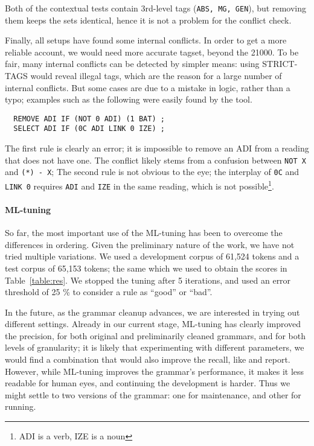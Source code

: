\documentclass[11pt]{article}
\begin{document}
\noindent Both of the contextual tests contain 3rd-level tags (\texttt{ABS, MG, GEN}), but removing them keeps the sets identical, hence it is not a problem for the conflict check.



Finally, all setups have found some internal conflicts. In order to get a more reliable account, we would need 
more accurate tagset, beyond the 21000. To be fair, many internal conflicts can be detected by simpler means:
using STRICT-TAGS would reveal illegal tags, which are the reason for a large number of internal conflicts. 
But some cases are due to a mistake in logic, rather than a typo; examples such as the following were easily found by the tool. %

\begin{verbatim}
  REMOVE ADI IF (NOT 0 ADI) (1 BAT) ;
  SELECT ADI IF (0C ADI LINK 0 IZE) ;
\end{verbatim}

\noindent The first rule is clearly an error; it is impossible to remove an ADI from a reading that does not have one.
The conflict likely stems from a confusion between \texttt{NOT X} and \texttt{(*) - X};
The second rule is not obvious to the eye; the interplay of \texttt{0C} and \texttt{LINK 0} requires 
\texttt{ADI} and \texttt{IZE} in the same reading, which is not possible\footnote{ADI is a verb, IZE is a noun}.


\paragraph{ML-tuning}

So far, the most important use of the ML-tuning has been to overcome
the differences in ordering. 
Given the preliminary nature of the work, we have not tried multiple
variations. We used a development corpus of 61,524
tokens and a test corpus of 65,153 tokens; the same which we used to
obtain the scores in Table~\ref{table:res}. We stopped the tuning
after 5 iterations, and used an error threshold of 25 \% to consider a
rule as ``good'' or ``bad''. 

In the future, as the grammar cleanup advances, we are interested in
trying out different settings.
Already in our current stage, ML-tuning has clearly
improved the precision, for both original and preliminarily cleaned
grammars, and for both levels of granularity; it is likely that
experimenting with different parameters, we would find a combination
that would also improve the recall, like  
and  report.
However, while ML-tuning improves the grammar's performance, it makes
it less readable for human eyes, and continuing the development is
harder. Thus we might settle to two versions of the grammar: one for
maintenance, and other for running.
\end{document}
